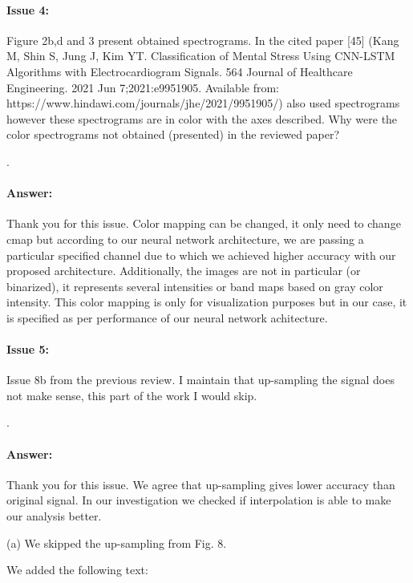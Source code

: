 \documentclass{article}
\begin{document}
\paragraph{Issue 4:}
\begin{displayquote}
Figure 2b,d and 3 present obtained spectrograms. In the cited paper [45] (Kang M, Shin S, Jung J, Kim YT. Classification of Mental Stress Using CNN-LSTM Algorithms with Electrocardiogram Signals. 564 Journal of Healthcare Engineering. 2021 Jun 7;2021:e9951905. Available from: https://www.hindawi.com/journals/jhe/2021/9951905/) also used spectrograms however these spectrograms are in color with the axes described. Why were the color spectrograms not obtained (presented) in the reviewed paper? 
\end{displayquote}.

\paragraph{Answer:}
Thank you for this issue. Color mapping can be changed, it only need to change cmap but according to our neural network architecture, we are passing a particular specified channel due to which we achieved higher accuracy with our proposed architecture. Additionally, the images are not in particular (or binarized), it represents several intensities or band maps based on gray color intensity. This color mapping is only for visualization purposes but in our case, it is specified as per performance of our neural network achitecture. 

\paragraph{Issue 5:}
\begin{displayquote}
Issue 8b from the previous review. I maintain that up-sampling the signal does not make sense, this part of the work I would skip.
\end{displayquote}.

\paragraph{Answer:}
Thank you for this issue. 
We agree that up-sampling gives lower accuracy than original signal.
In our investigation we checked if interpolation is able to make our analysis better.

(a) We skipped the up-sampling from Fig. 8.

We added the following text:
\end{document}
